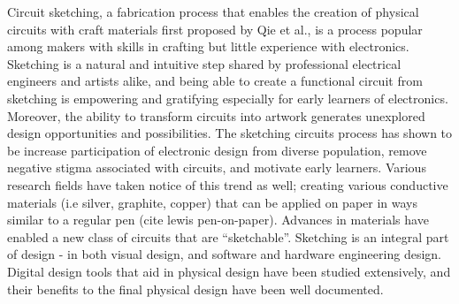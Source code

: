 \documentclass{sigchi}
\begin{document}
Circuit sketching, a fabrication process that enables the creation of physical circuits with craft materials first proposed by Qie et al., is a process popular among makers with skills in crafting but little experience with electronics. Sketching is a natural and intuitive step shared by professional electrical engineers and artists alike, and being able to create a functional circuit from sketching is empowering and gratifying especially for early learners of electronics. Moreover, the ability to transform circuits into artwork generates unexplored design opportunities and possibilities.
The sketching circuits process has shown to be increase participation of electronic design from diverse population, remove negative stigma associated with circuits, and motivate early learners. Various research fields have taken notice of this trend as well; creating various conductive materials (i.e silver, graphite, copper) that can be applied on paper in ways similar to a regular pen (cite lewis pen-on-paper). Advances in materials have enabled a new class of circuits that are ``sketchable''.
Sketching is an integral part of design - in both visual design, and software and hardware engineering design. Digital design tools that aid in physical design have been studied extensively, and their benefits to the final physical design have been well documented.
\end{document}
